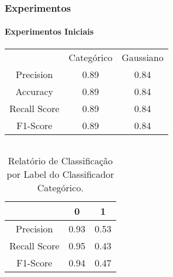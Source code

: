 \documentclass{beamer}
\begin{document}
\begin{frame}
\frametitle{Experimentos}
\framesubtitle{Experimentos Iniciais}
\begin{table}[H]
    \centering
    \begin{small}
        \begin{tabular}{ccc}
            \\
            \\
            \hline
                                    & Categórico       & Gaussiano\\
            \hline
            Precision               & 0.89             & 0.84\\
            Accuracy                & 0.89             & 0.84\\
            Recall Score            & 0.89             & 0.84\\
            F1-Score                & 0.89             & 0.84\\
            
            \hline
        \end{tabular}
    \end{small}
\end{table}
    \begin{columns}
        \begin{column}{0.5\textwidth}
            \begin{table}[H]

                \centering
                \caption{\label{tab:cr1-cnb} Relatório de Classificação por Label do Classificador Categórico.}
                \begin{small}
                    \begin{tabular}{ccc}
                    
                        \hline
                                                & 0                & 1\\
                        \hline
                        Precision               & 0.93             & 0.53\\
                        Recall Score            & 0.95             & 0.43\\
                        F1-Score                & 0.94             & 0.47\\
                        

\end{tabular}
\end{small}
\end{table}
\end{column}
\end{columns}
\end{frame}
\end{document}
